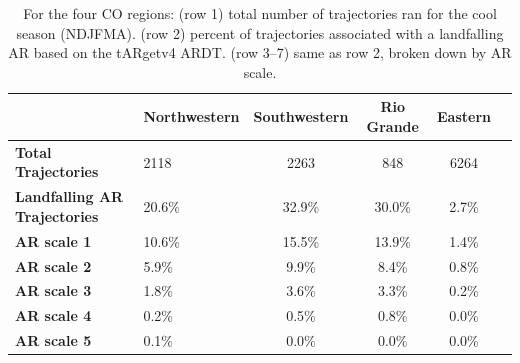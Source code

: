 \documentclass[draft]{agujournal2019}
\begin{document}

\begin{table}[htbp]
\caption{For the four CO regions: (row 1) total number of trajectories ran for the cool season (NDJFMA).
        (row 2) percent of trajectories associated with a landfalling AR based on the 
        tARgetv4 ARDT. 
        (row 3--7) same as row 2, broken down by AR scale.}
\label{table:NDJFMAtARget}
\begin{tabular}{lp{2cm}cccc}
\toprule
 & Northwestern & Southwestern & Rio Grande & Eastern \\
\midrule
\textbf{Total Trajectories} & 2118 & 2263 & 848 & 6264 \\
\textbf{Landfalling AR Trajectories} & 20.6\% & 32.9\% & 30.0\% & 2.7\% \\
\textbf{AR scale 1} & 10.6\% & 15.5\% & 13.9\% & 1.4\% \\
\textbf{AR scale 2} & 5.9\% & 9.9\% & 8.4\% & 0.8\% \\
\textbf{AR scale 3} & 1.8\% & 3.6\% & 3.3\% & 0.2\% \\
\textbf{AR scale 4} & 0.2\% & 0.5\% & 0.8\% & 0.0\% \\
\textbf{AR scale 5} & 0.1\% & 0.0\% & 0.0\% & 0.0\% \\
\bottomrule
\end{tabular}
\end{table}
\end{document}
